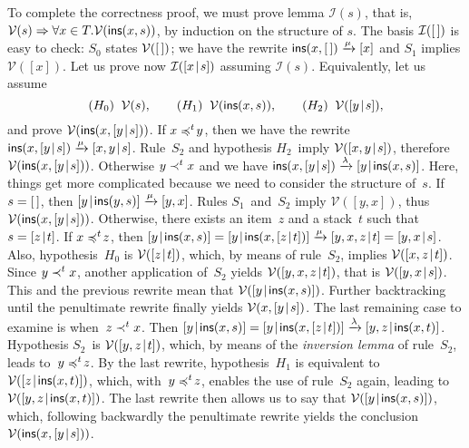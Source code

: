 To complete the correctness proof, we must prove lemma
\(\mathcal{I}(s)\), that is, \(\mathcal{V}(s) \Rightarrow \forall x
\in T.\mathcal{V}(\textsf{ins}(x,s))\), by induction on the structure of
\(s\). The basis \(\mathcal{I}([\,])\) is easy to check: \(S_0\) states
\(\mathcal{V}([\,])\); we have the rewrite \(\textsf{ins}(x,[\,])
\xrightarrow{\smash{\mu}} [x]\) and \(S_1\) implies
\(\mathcal{V}([x])\). Let us prove now \(\mathcal{I}([{x}\!\mid\!{s}])\)
assuming \(\mathcal{I}(s)\). Equivalently, let us assume
\[
(H_0) \;\; \mathcal{V}(s),\qquad
(H_1) \;\; \mathcal{V}(\textsf{ins}(x,s)),\qquad
(H_2) \;\; \mathcal{V}([{y}\!\mid\!{s}]),
\]
and prove \(\mathcal{V}(\textsf{ins}(x,[{y}\!\mid\!{s}]))\). If \(x \mathrel{\preccurlyeq^t\!}
y\), then we have the rewrite \(\textsf{ins}(x,[{y}\!\mid\!{s}])
\xrightarrow{\smash{\mu}} [{x,y}\!\mid\!{s}]\). Rule~\(S_2\) and hypothesis
\(H_2\)~imply \(\mathcal{V}([{x,y}\!\mid\!{s}])\), therefore
\(\mathcal{V}(\textsf{ins}(x,[{y}\!\mid\!{s}]))\). Otherwise \({y \mathrel{\prec^t} x}\)
and we have \(\textsf{ins}(x,[{y}\!\mid\!{s}]) \xrightarrow{\smash{\lambda}}
[{y}\!\mid\!{\textsf{ins}(x,s)}]\). Here, things get more complicated because
we need to consider the structure of~\(s\). If~\({s=[\,]}\), then
\([{y}\!\mid\!{\textsf{ins}(y,s)}] \xrightarrow{\smash{\mu}} [y,x]\). Rules
\(S_1\)~and~\(S_2\) imply \(\mathcal{V}([y,x])\), thus
\(\mathcal{V}(\textsf{ins}(x,[{y}\!\mid\!{s}]))\). Otherwise, there exists an
item~\(z\) and a stack~\(t\) such that \(s = [{z}\!\mid\!{t}]\). If \(x
\mathrel{\preccurlyeq^t\!} z\), then \(\cons{y}{\fun{ins}(x,s)} =
\cons{y}{\fun{ins}(x,\cons{z}{t})} \smashedrightarrow{\mu}
\cons{y,x,z}{t} = \cons{y,x}{s}\). Also, hypothesis~\(H_0\) is
\(\mathcal{V}([{z}\!\mid\!{t}])\), which, by means of rule~\(S_2\), implies
\(\mathcal{V}([{x,z}\!\mid\!{t}])\). Since \({y \mathrel{\prec^t} x}\), another
application of~\(S_2\) yields \(\mathcal{V}([{y,x,z}\!\mid\!{t}])\), that
is \(\mathcal{V}([{y,x}\!\mid\!{s}])\). This and the previous rewrite mean
that \(\mathcal{V}([{y}\!\mid\!{\textsf{ins}(x,s)}])\). Further backtracking
until the penultimate rewrite finally yields
\(\mathcal{V}(x,[{y}\!\mid\!{s}])\). The last remaining case to examine is
when~\({z \mathrel{\prec^t} x}\). Then \(\cons{y}{\fun{ins}(x,s)} =
\cons{y}{\fun{ins}(x,\cons{z}{t})} \xrightarrow{\lambda}
\cons{y,z}{\fun{ins}(x,t)}\). Hypothesis \(S_2\)~is
\(\mathcal{V}([{y,z}\!\mid\!{t}])\), which, by means of the \emph{inversion
  lemma} of rule~\(S_2\), leads to~\({y \mathrel{\preccurlyeq^t\!} z}\). By the last
rewrite, hypothesis~\(H_1\) is equivalent to
\(\mathcal{V}([{z}\!\mid\!{\textsf{ins}(x,t)}])\), which, with~\({y \mathrel{\preccurlyeq^t\!}
  z}\), enables the use of rule~\(S_2\) again, leading to
\(\mathcal{V}([{y,z}\!\mid\!{\textsf{ins}(x,t)}])\). The last rewrite then
allows us to say that \(\mathcal{V}([{y}\!\mid\!{\textsf{ins}(x,s)}])\),
which, following backwardly the penultimate rewrite yields the
conclusion \(\mathcal{V}(\textsf{ins}(x,[{y}\!\mid\!{s}]))\).

